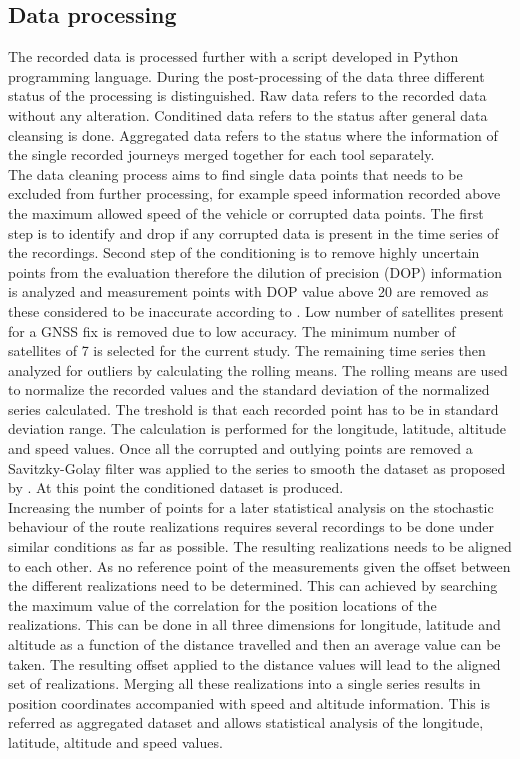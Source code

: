 \documentclass{article}
\begin{document}
		\subsection{Data processing}
			The recorded data is processed further with a script developed in Python programming language. During the post-processing of the data three different status of the processing is distinguished. Raw data refers to the recorded data without any alteration. Conditined data refers to the status after general data cleansing is done. Aggregated data refers to the status where the information of the single recorded journeys merged together for each tool separately. \\
			The data cleaning process aims to find single data points that needs to be excluded from further processing, for example speed information recorded above the maximum allowed speed of the vehicle or corrupted data points. The first step is to identify and drop if any corrupted data is present in the time series of the recordings. 
			Second step of the conditioning is to remove highly uncertain points from the evaluation therefore the dilution of precision (DOP) information is analyzed and measurement points with DOP value above 20 are removed as these considered to be inaccurate according to \cite{tahsinAnalysisDOPIts2015}. Low number of satellites present for a GNSS fix is removed due to low accuracy. The minimum number of satellites of 7 is selected for the current study. 
			The remaining time series then analyzed for outliers by calculating the rolling means. The rolling means are used to normalize the recorded values and the standard deviation of the normalized series calculated. The treshold is that each recorded point has to be in  standard deviation range. The calculation is performed for the longitude, latitude, altitude and speed values. Once all the corrupted and outlying points are removed a Savitzky-Golay filter was applied to the series to smooth the dataset as proposed by \cite{wilkDigitalFilteringRailway2020}. At this point the conditioned dataset is produced. \\
			Increasing the number of points for a later statistical analysis on the stochastic behaviour of the route realizations requires several recordings to be done under similar conditions as far as possible. The resulting realizations needs to be aligned to each other. As no reference point of the measurements given the offset between the different realizations need to be determined. This can achieved by searching the maximum value of the correlation for the position locations of the realizations. This can be done in all three dimensions for longitude, latitude and altitude as a function of the distance travelled and then an average value can be taken. The resulting offset applied to the distance values will lead to the aligned set of realizations. Merging all these realizations into a single series results in position coordinates accompanied with speed and altitude information. This is referred as aggregated dataset and allows statistical analysis of the longitude, latitude, altitude and speed values.		
\end{document}
